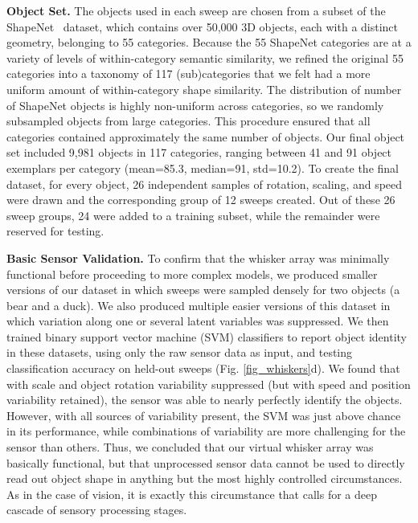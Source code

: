 \textbf{Object Set.} The objects used in each sweep are chosen from a subset of the ShapeNet~\cite{Chang2015} dataset, which contains over 50,000 3D objects, each with a distinct geometry, belonging to 55 categories.
Because the 55 ShapeNet categories are at a variety of levels of within-category semantic similarity, we refined the original 55 categories into a taxonomy of 117 (sub)categories that we felt had a more uniform amount of within-category shape similarity. 
The distribution of number of ShapeNet objects is highly non-uniform across categories, so we randomly subsampled objects from large categories.  
This procedure ensured that all categories contained approximately the same number of objects.  
Our final object set included 9,981 objects in 117 categories, ranging between 41 and 91 object exemplars per category (mean=85.3, median=91, std=10.2). 
To create the final dataset, for every object, 26 independent samples of rotation, scaling, and speed were drawn and the corresponding group of 12 sweeps created.   
Out of these 26 sweep groups, 24 were added to a training subset, while the remainder were reserved for testing.

\textbf{Basic Sensor Validation.} To confirm that the whisker array was minimally functional before proceeding to more complex models, we produced smaller versions of our dataset in which sweeps were sampled densely for two objects (a bear and a duck).  
We also produced multiple easier versions of this dataset in which variation along one or several latent variables was suppressed. 
We then trained binary support vector machine (SVM) classifiers to report object identity in these datasets, using only the raw sensor data as input, and testing classification accuracy on held-out sweeps (Fig. \ref{fig_whiskers}d).  We found that with scale and object rotation variability suppressed (but with speed and position variability retained), the sensor was able to nearly perfectly identify the objects.  
However, with all sources of variability present, the SVM was just above chance in its performance,  
while combinations of variability are more challenging for the sensor than others. 
Thus, we concluded that our virtual whisker array was basically functional, but that unprocessed sensor data cannot be used to directly read out object shape in anything but the most highly controlled circumstances.
As in the case of vision, it is exactly this circumstance that calls for a deep cascade of sensory processing stages. 

